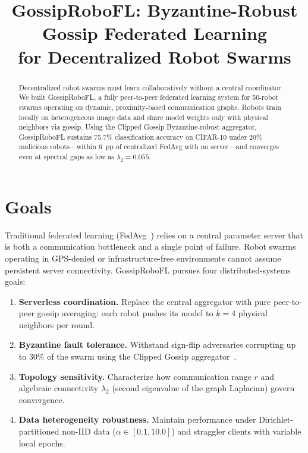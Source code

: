 \documentclass[conference]{IEEEtran}
\newcommand{\sys}{GossipRoboFL\xspace}
\begin{document}
\title{GossipRoboFL: Byzantine-Robust Gossip Federated Learning\\for Decentralized Robot Swarms}

\author{
}

\maketitle

\begin{abstract}
Decentralized robot swarms must learn collaboratively without a central
coordinator.
We built \sys, a fully peer-to-peer federated learning system for 50-robot
swarms operating on dynamic, proximity-based communication graphs.
Robots train locally on heterogeneous image data and share model weights only
with physical neighbors via gossip.
Using the Clipped Gossip Byzantine-robust aggregator, \sys sustains 75.7\%
classification accuracy on CIFAR-10 under 20\% malicious robots---within
6~pp of centralized FedAvg with no server---and converges even at spectral
gaps as low as $\lambda_2{=}0.055$.
\end{abstract}

\section{Goals}

Traditional federated learning (FedAvg~\cite{mcmahan2017}) relies on a
central parameter server that is both a communication bottleneck and a single
point of failure.
Robot swarms operating in GPS-denied or infrastructure-free environments
cannot assume persistent server connectivity.
\sys pursues four distributed-systems goals:

\begin{enumerate}
\item \textbf{Serverless coordination.}
Replace the central aggregator with pure peer-to-peer gossip averaging: each
robot pushes its model to $k{=}4$ physical neighbors per round.
\item \textbf{Byzantine fault tolerance.}
Withstand sign-flip adversaries corrupting up to 30\% of the swarm using the
Clipped Gossip aggregator~\cite{he2022}.
\item \textbf{Topology sensitivity.}
Characterize how communication range $r$ and algebraic connectivity
$\lambda_2$ (second eigenvalue of the graph Laplacian) govern convergence.
\item \textbf{Data heterogeneity robustness.}
Maintain performance under Dirichlet-partitioned non-IID data
($\alpha \in [0.1, 10.0]$) and straggler clients with variable local epochs.
\end{enumerate}
\end{document}
